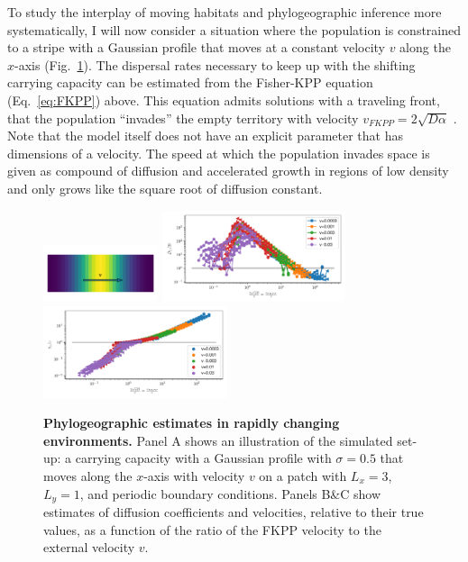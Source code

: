 \documentclass[aps,rmp, twocolumn]{revtex4}
\begin{document}
To study the interplay of moving habitats and phylogeographic inference more systematically, I will now consider a situation where the population is constrained to a stripe with a Gaussian profile that moves at a constant velocity $v$ along the $x$-axis (Fig.~\ref{fig:traveling_wave}).
The dispersal rates necessary to keep up with the shifting carrying capacity can be estimated from the Fisher-KPP equation (Eq.~\ref{eq:FKPP}) above.
This equation admits solutions with a traveling front, that the population ``invades'' the empty territory with velocity $v_{FKPP} = 2\sqrt{D \alpha}$ \citep{fisher_wave_1937,KPP1937,hallatschek_life_2010}.
Note that the model itself does not have an explicit parameter that has dimensions of a velocity.
The speed at which the population invades space is given as compound of diffusion and accelerated growth in regions of low density and only grows like the square root of diffusion constant.


\begin{figure}
    \includegraphics[width=0.3\textwidth]{figures/traveling_wave}
    \includegraphics[width=0.48\textwidth]{figures/waves_D}
    \includegraphics[width=0.48\textwidth]{figures/waves_v}
    \caption{\label{fig:traveling_wave} {\bf Phylogeographic estimates in rapidly changing environments.} Panel A shows an illustration of the simulated set-up: a carrying capacity with a Gaussian profile with $\sigma=0.5$ that moves along the $x$-axis with velocity $v$ on a patch with $L_x=3$, $L_y=1$, and periodic boundary conditions.
    Panels B\&C show estimates of diffusion coefficients and velocities, relative to their true values, as a function of the ratio of the FKPP velocity to the external velocity $v$. }
\end{figure}
\end{document}
